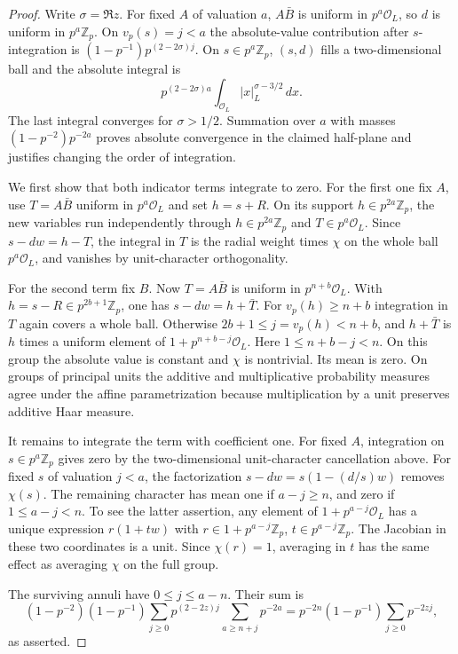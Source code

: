\documentclass[11pt]{article}
\newcommand{\Zp}{\mathbb Z_p}
\newcommand{\OO}{\mathcal O}
\begin{document}
\begin{proof}
Write $\sigma=\Re z$. For fixed $A$ of valuation $a$,
$A\bar B$ is uniform in $p^a\OO_L$, so $d$ is uniform in
$p^a\Zp$. On $v_p(s)=j<a$ the absolute-value contribution after
$s$-integration is $(1-p^{-1})p^{(2-2\sigma)j}$. On
$s\in p^a\Zp$, $(s,d)$ fills a two-dimensional ball and the
absolute integral is
\[
 p^{(2-2\sigma)a}\int_{\OO_L}|x|_L^{\sigma-3/2}\,dx .
\]
The last integral converges for $\sigma>1/2$. Summation over $a$
with masses $(1-p^{-2})p^{-2a}$ proves absolute convergence
in the claimed half-plane and justifies changing the order of
integration.

We first show that both indicator terms integrate to zero.
For the first one fix $A$, use $T=A\bar B$ uniform in $p^a\OO_L$
and set $h=s+R$. On its support $h\in p^{2a}\Zp$, the new
variables run independently through $h\in p^{2a}\Zp$ and
$T\in p^a\OO_L$. Since $s-dw=h-T$, the integral in $T$ is
the radial weight times $\chi$ on the whole ball $p^a\OO_L$,
and vanishes by unit-character orthogonality.

For the second term fix $B$. Now $T=A\bar B$ is uniform in
$p^{n+b}\OO_L$. With $h=s-R\in p^{2b+1}\Zp$, one has
$s-dw=h+\bar T$. For $v_p(h)\ge n+b$ integration in $T$ again
covers a whole ball. Otherwise $2b+1\le j=v_p(h)<n+b$, and
$h+\bar T$ is $h$ times a uniform element of $1+p^{n+b-j}\OO_L$.
Here $1\le n+b-j<n$. On this group the absolute value is constant
and $\chi$ is nontrivial. Its mean is zero. On groups of principal
units the additive and multiplicative probability measures agree
under the affine parametrization because multiplication by a unit
preserves additive Haar measure.

It remains to integrate the term with coefficient one. For fixed $A$,
integration on $s\in p^a\Zp$ gives zero by the two-dimensional
unit-character cancellation above. For fixed $s$ of valuation
$j<a$, the factorization $s-dw=s(1-(d/s)w)$ removes $\chi(s)$.
The remaining character has mean one if $a-j\ge n$, and zero if
$1\le a-j<n$. To see the latter assertion, any element of
$1+p^{a-j}\OO_L$ has a unique expression $r(1+tw)$ with
$r\in1+p^{a-j}\Zp$, $t\in p^{a-j}\Zp$. The Jacobian in these
two coordinates is a unit. Since $\chi(r)=1$, averaging in $t$
has the same effect as averaging $\chi$ on the full group.

The surviving annuli have $0\le j\le a-n$. Their sum is
\[
 (1-p^{-2})(1-p^{-1})
 \sum_{j\ge0}p^{(2-2z)j}
          \sum_{a\ge n+j}p^{-2a}
 =p^{-2n}(1-p^{-1})\sum_{j\ge0}p^{-2zj},
\]
as asserted.
\end{proof}
\end{document}
